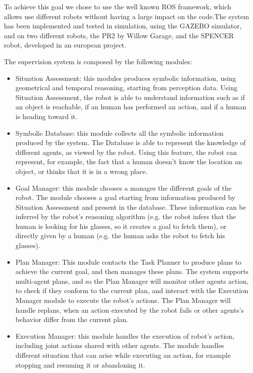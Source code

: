 To achieve this goal we chose to use the well known ROS framework, which allows use different robots without having a large impact on the code.The system has been implemented and tested in simulation, using the GAZEBO simulator, and on two different robots, the PR2 by Willow Garage, and the SPENCER robot, developed in an european project. 

The supervision system is composed by the following modules:
\begin{itemize}
\item Situation Assessment: this modules produces symbolic information, using geometrical and temporal reasoning, starting from perception data. Using Situation Assessment, the robot is able to understand information such as if an object is reachable, if an human has performed an action, and if a human is heading toward it.
\item Symbolic Database: this module collects all the symbolic information produced by the system. The Database is able to represent the knowledge of different agents, as viewed by the robot. Using this feature, the robot can represent, for example, the fact that a human doesn't know the location an object, or thinks that it is in a wrong place.
\item Goal Manager: this module chooses a manages the different goals of the robot. The module chooses a goal starting from information produced by Situation Assessment and present in the database. These information can be inferred by the robot's reasoning algorithm (e.g. the robot infers that the human is looking for his glasses, so it creates a goal to fetch them), or directly given by a human (e.g. the human asks the robot to fetch his glasses). 
\item Plan Manager: This module contacts the Task Planner to produce plans to achieve the current goal, and then manages these plans. The system supports multi-agent plans, and so the Plan Manager will monitor other agents action, to check if they conform to the current plan, and interact with the Execution Manager module to execute the robot's actions. The Plan Manager will handle replans, when an action executed by the robot fails or other agents's behavior differ from the current plan.
\item Execution Manager: this module handles the execution of robot's action, including joint actions shared with other agents. The module handles different situation that can arise while executing an action, for example stopping and resuming it or abandoning it.
\end{itemize}

